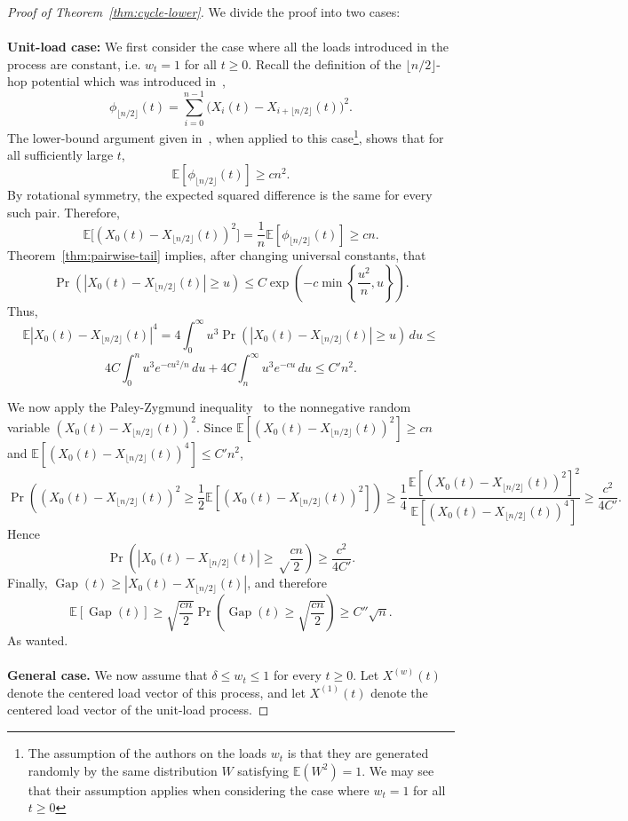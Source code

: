 \documentclass[11pt]{article}
\numberwithin{equation}{section}
\newcommand{\E}{\mathbb{E}}
\newcommand{\1}{\mathbf{1}}
\newcommand{\Gap}{\operatorname{Gap}}
\begin{document}
\begin{proof}[Proof of Theorem~\ref{thm:cycle-lower}]
We divide the proof into two cases:
\\
\\
\textbf{Unit-load case:} We first consider the case where all the loads introduced in the process are constant, i.e. $w_t = 1$ for all $t\ge 0$. Recall the definition of the \(\lfloor n/2\rfloor\)-hop potential which was introduced in~\cite{AlistarhNadiradzeSabour},
\[
\phi_{\lfloor n/2\rfloor}(t)
=
\sum_{i=0}^{n-1}
\bigl(X_i(t)-X_{i+{\lfloor n/2\rfloor}}(t)\bigr)^2.
\]
The lower-bound argument given in~\cite{AlistarhNadiradzeSabour}, when applied to this case\footnote{The assumption of the authors on the loads $w_t$ is that they are generated randomly by the same distribution $W$ satisfying $\E(W^2)=1$. We may see that their assumption applies when considering the case where $w_t=1$ for all $t \ge 0$}, shows that for all sufficiently large \(t\),
\[
\E[\phi_{\lfloor n/2\rfloor}(t)]\ge c n^2.
\]
By rotational symmetry, the expected squared difference is the same for every such pair. Therefore,  
\[
\E\bigl[(X_0(t)-X_{\lfloor n/2\rfloor}(t))^2\bigr]
=
\frac1n\E[\phi_{\lfloor n/2\rfloor}(t)]
\ge cn.
\]
Theorem~\ref{thm:pairwise-tail} implies, after changing universal constants, that
\[
\Pr(|X_0(t)-X_{\lfloor n/2\rfloor}(t)|\ge u)
\le
C\exp\left(
-c\min\left\{\frac{u^2}{n},u\right\}
\right).
\]
Thus,
\[
\E|X_0(t)-X_{\lfloor n/2\rfloor}(t)|^4
=
4\int_0^\infty u^3\Pr(|X_0(t)-X_{\lfloor n/2\rfloor}(t)|\ge u)\,du
\le
\]
\[
4C\int_0^n u^3e^{-cu^2/n}\,du
+
4C\int_n^\infty u^3e^{-cu}\,du
\le
C'n^2.
\]

We now apply the Paley-Zygmund inequality~\cite{PaleyZygmund} to the nonnegative random
variable \((X_0(t)-X_{\lfloor n/2\rfloor}(t))^2\). Since
\(\E[(X_0(t)-X_{\lfloor n/2\rfloor}(t))^2]\ge cn\) and \(\E[(X_0(t)-X_{\lfloor n/2\rfloor}(t))^4]\le C'n^2\),
\[
\Pr\left(
(X_0(t)-X_{\lfloor n/2\rfloor}(t))^2\ge\frac12\E[(X_0(t)-X_{\lfloor n/2\rfloor}(t))^2]
\right)
\ge
\frac14
\frac{\E[(X_0(t)-X_{\lfloor n/2\rfloor}(t))^2]^2}{\E[(X_0(t)-X_{\lfloor n/2\rfloor}(t))^4]}
\ge \frac{c^2}{4C'}.
\]
Hence
\[
\Pr\left(
|X_0(t)-X_{\lfloor n/2\rfloor}(t)|\ge \sqrt \frac{cn}{2}
\right)
\ge \frac{c^2}{4C'}.
\]
Finally, \(\Gap(t)\ge |X_0(t)-X_{\lfloor n/2\rfloor}(t)|\), and therefore 
\[
\E[\Gap(t)]
\ge \sqrt{\frac{cn}{2}} \Pr\left(\Gap(t)\ge \sqrt{\frac{cn}{2}}\right) \ge
C''\sqrt n.
\]
As wanted.
\\
\\
\textbf{General case.}
We now assume that
\(
\delta \le w_t \le 1
\)
for every \(t \ge 0\). Let \(X^{(w)}(t)\) denote the centered load vector of this process, and let \(X^{(1)}(t)\) denote the centered load vector of the unit-load process.


\end{proof}
\end{document}
